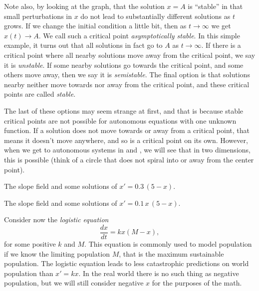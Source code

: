 \documentclass{ximera}
\begin{document}
Note also, by looking at the graph, that the solution $x=A$ is ``stable'' in that small perturbations in $x$ do not lead to substantially different solutions as $t$ grows. If we change the initial condition a little bit, then as $t \to \infty$ we get $x(t) \to A$.  We call such a critical point \emph{asymptotically stable}. In this simple example, it turns out that all solutions in fact go to $A$ as $t \to \infty$.  If there is a critical point where all nearby solutions move away from the critical point, we say it is \emph{unstable}. If some nearby solutions go towards the critical point, and some others move away, then we say it is \emph{semistable}. The final option is that solutions nearby neither move towards nor away from the critical point, and these critical points are called \emph{stable}.

The last of these options may seem strange at first, and that is because stable critical points are not possible for autonomous equations with one unknown function. If a solution does not move towards or away from a critical point, that means it doesn't move anywhere, and so is a critical point on its own. However, when we get to autonomous systems in  and , we will see that in two dimensions, this is possible (think of a circle that does not spiral into or away from the center point). 


\begin{myfig}
    \parbox[t]{3.0in}{
     \capstart
     \caption{The slope field and some solutions of
     $x' = 0.3\,(5-x)$.\label{2.2:coffeefig}}
    }
    \quad
    \parbox[t]{3.0in}{
     \capstart
     \caption{The slope field and some solutions of
     $x' = 0.1\,x\,(5-x)$.\label{2.2:logisticfig}}
    }
\end{myfig}


Consider now the \emph{logistic equation}
\begin{equation*}
    \frac{dx}{dt} = kx(M-x) ,
\end{equation*}
for some positive $k$ and $M$.  This equation is commonly used to model population if we know the limiting population $M$, that is the maximum sustainable population.  The logistic equation leads to less catastrophic predictions on world population than $x'=kx$.  In the real world there is no such thing as negative population, but we will still consider negative $x$ for the purposes of the math.
\end{document}
